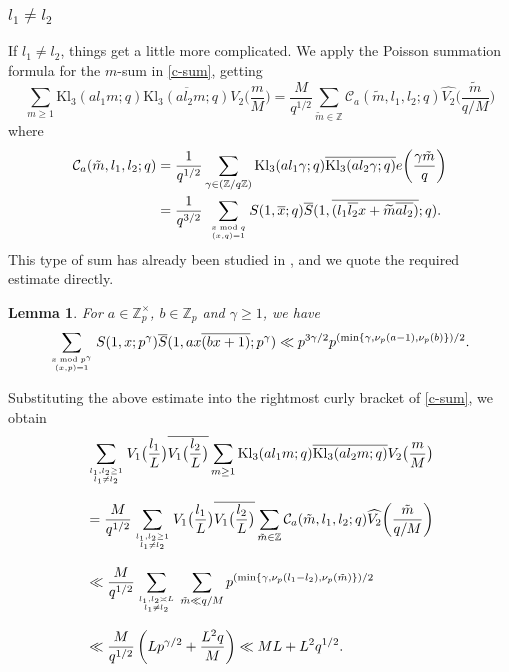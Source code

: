 \documentclass[11pt,reqno]{amsart}
\numberwithin{equation}{section}
\theoremstyle{plain}
\newtheorem{lemma}{Lemma}[section]
\theoremstyle{definition}
\begin{document}
\subsubsection{$l_1 \neq l_2$}
If $l_1\neq l_2$, things get a little more complicated.
We apply the Poisson summation formula for the $m$-sum in \eqref{c-sum}, getting
\begin{equation*}\label{aa}
\sum_{m\geq 1}\mathrm{Kl}_3(al_1 m;q)
\overline{\mathrm{Kl}_3(al_2 m;q)}V_2\big(\frac{m}{M}\big)
=\frac{M}{q^{1/2}}\sum_{\tilde{m}\in \mathbb{Z}}
\mathcal{C}_{a}(\tilde{m},l_1,l_2;q)\widehat{V_2}\bigg(\frac{\tilde{m}}{q/M}\bigg)
\end{equation*}
where
\begin{equation*}\begin{split}\mathcal{C}_{a}(\tilde{m},l_1,l_2;q)&=\frac{1}{q^{1/2}}
\sum_{\gamma\in(\mathbb{Z}/q\mathbb{Z})}
\mathrm{Kl}_3(al_1 \gamma;q)\overline{\mathrm{Kl}_3(al_2 \gamma;q)}
e\bigg(\frac{\gamma \tilde{m}}{q}\bigg)
\\
&=\frac{1}{q^{3/2}}\,\,\sum_{x\bmod q\atop(x,q)=1}S(1,\overline{x}; q)
\overline{S}(1,\overline{(l_1\overline{l_2}x+\widetilde{m}\overline{al_2})}; q).
\end{split}
\end{equation*}
This type of sum has already been studied in \cite{DF1997}, and we quote the required estimate directly. 
\begin{lemma}
For $a \in \mathbb{Z}_p^{\times}$, $b \in \mathbb{Z}_p$ and $\gamma\geq1$, we have
\begin{equation*}
\sum_{x\bmod p^\gamma\atop(x,p)=1}S(1,x; p^\gamma)
 \overline{S}(1,ax\overline{(bx+1)}; p^\gamma)
 \ll p^{3\gamma/2}p^{(\min\{\gamma, \nu_p(a-1),\nu_p(b)\})/2}.
\end{equation*}
\end{lemma}
Substituting the above estimate into the rightmost curly bracket of \eqref{c-sum}, we obtain
\begin{align}\label{bb}
&\sum_{l_1,l_2\geq 1\atop l_1\neq l_2}V_1\big(\frac{l_1}{L}\big)
\overline{V_1\big(\frac{l_2}{L}\big)}\sum_{m\geq 1}
\mathrm{Kl}_3(al_1 m;q)\overline{\mathrm{Kl}_3(al_2 m;q)}
V_2\big(\frac{m}{M}\big)\nonumber\\\noalign{\vskip 2,8mm}
&=\frac{M}{q^{1/2}}\sum_{l_1,l_2\geq 1\atop l_1\neq l_2}V_1\big(\frac{l_1}{L}\big)
\overline{V_1\big(\frac{l_2}{L}\big)}\sum_{\tilde{m}\in \mathbb{Z}}
\mathcal{C}_{a}(\tilde{m},l_1,l_2;q)\widehat{V_2}\bigg(\frac{\tilde{m}}{q/M}\bigg)\nonumber\\\noalign{\vskip 2,8mm}
&\ll \frac{M}{q^{1/2}}\sum_{l_1,l_2\asymp L\atop l_1\neq l_2}\,
\sum_{\tilde{m}\ll q/M}
p^{(\min\{\gamma, \nu_p(l_1-l_2),\nu_p(\tilde{m})\})/2}\nonumber\\\noalign{\vskip 2,8mm}
&\ll \frac{M}{q^{1/2}}
\left(Lp^{\gamma/2}+\frac{L^2q}{M}\right)
\ll ML+L^2q^{1/2}.
\end{align}
\end{document}
